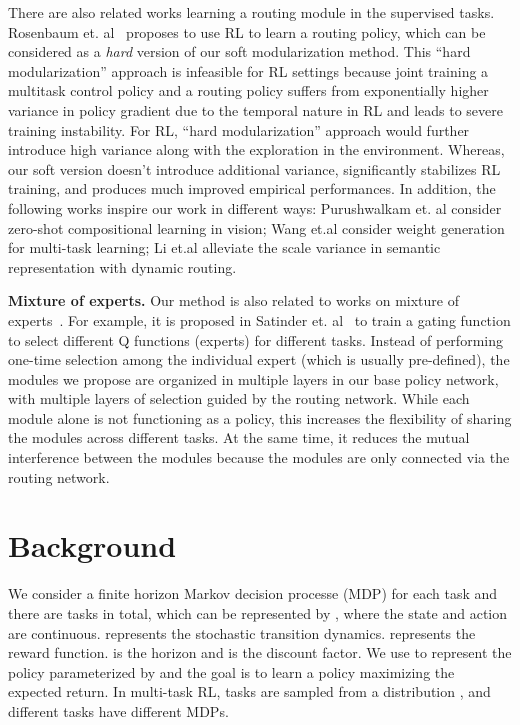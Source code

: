 \documentclass{article}
\begin{document}
There are also related works learning a routing module in the supervised tasks.  Rosenbaum et. al~\cite{rosenbaum2017routing,rosenbaum2019routing} proposes to use RL to learn a routing policy, which can be considered as a \emph{hard} version of our soft modularization method. This ``hard modularization'' approach is infeasible for RL settings because joint training a multitask control policy and a routing policy suffers from exponentially higher variance in policy gradient due to the temporal nature in RL and leads to severe training instability. For RL, ``hard modularization'' approach would further introduce high variance along with the exploration in the environment. Whereas, our soft version doesn't introduce additional variance, significantly stabilizes RL training, and produces much improved empirical performances. In addition, the following works inspire our work in different ways:  Purushwalkam et. al \cite{purushwalkam2019task} consider zero-shot compositional learning in vision; Wang et.al \cite{wang2019tafe} consider weight generation for multi-task learning; Li et.al \cite{li2020learning} alleviate the scale variance in semantic representation with dynamic routing.

\textbf{Mixture of experts.} Our method is also related to works on mixture of experts~\cite{MI1993,gomi1993,jacobs1991,singh1992transfer,NIPS1993_750,Ma2018MMoE}. For example, it is proposed in Satinder et. al~\cite{singh1992transfer} to train a gating function to select different Q functions (experts) for different tasks. Instead of performing one-time selection among the individual expert (which is usually pre-defined), the modules we propose are organized in multiple layers in our base policy network, with multiple layers of selection guided by the routing network. While each module alone is not functioning as a policy, this increases the flexibility of sharing the modules across different tasks. At the same time, it reduces the mutual interference between the modules because the modules are only connected via the routing network. 

 
\vspace{-0.1in}
\section{Background}\label{sec:background}
\vspace{-0.1in}
We consider a finite horizon Markov decision processe (MDP) for each task  and there are  tasks in total, which can be represented by , where the state  and action  are continuous.  represents the stochastic transition dynamics.  represents the reward function.  is the horizon and   is the discount factor. We use  to represent the policy parameterized by 
and the goal is to learn a policy maximizing the expected return.
In multi-task RL, tasks are sampled from a distribution , and different tasks have different MDPs. 
\end{document}
